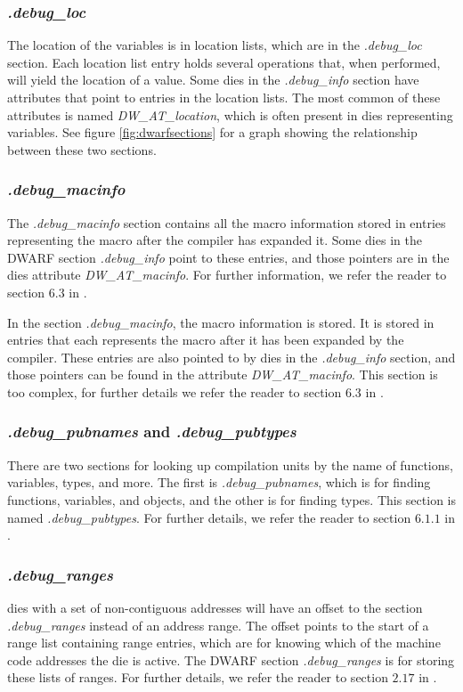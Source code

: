\subsubsection{\emph{.debug\_loc}}
The location of the variables is in location lists, which are in the \emph{.debug\_loc} section.
Each location list entry holds several operations that, when performed, will yield the location of a value.
Some \glspl{die} in the \emph{.debug\_info} section have attributes that point to entries in the location lists.
The most common of these attributes is named \emph{DW\_AT\_location}, which is often present in \glspl{die} representing variables.
See figure \ref{fig:dwarfsections} for a graph showing the relationship between these two sections.


\subsubsection{\emph{.debug\_macinfo}}
The \emph{.debug\_macinfo} section contains all the macro information stored in entries representing the macro after the compiler has expanded it.
Some \glspl{die} in the \gls{DWARF} section \emph{.debug\_info} point to these entries, and those pointers are in the \glspl{die} attribute \emph{DW\_AT\_macinfo}.
For further information, we refer the reader to section $6.3$ in \cite{dwarf}.


In the section \emph{.debug\_macinfo}, the macro information is stored.
It is stored in entries that each represents the macro after it has been expanded by the compiler.
These entries are also pointed to by \glspl{die} in the \emph{.debug\_info} section, and those pointers can be found in the attribute \emph{DW\_AT\_macinfo}.
This section is too complex, for further details we refer the reader to section $6.3$ in \cite{dwarf}.


\subsubsection{\emph{.debug\_pubnames} and \emph{.debug\_pubtypes}}
There are two sections for looking up compilation units by the name of functions, variables, types, and more.
The first is \emph{.debug\_pubnames}, which is for finding functions, variables, and objects, and the other is for finding types.
This section is named \emph{.debug\_pubtypes}.
For further details, we refer the reader to section $6.1.1$ in \cite{dwarf}.


\subsubsection{\emph{.debug\_ranges}}
\glspl{die} with a set of non-contiguous addresses will have an offset to the section \emph{.debug\_ranges} instead of an address range.
The offset points to the start of a range list containing range entries, which are for knowing which of the machine code addresses the \gls{die} is active.
The \gls{DWARF} section \emph{.debug\_ranges} is for storing these lists of ranges.
For further details, we refer the reader to section $2.17$ in \cite{dwarf}.


